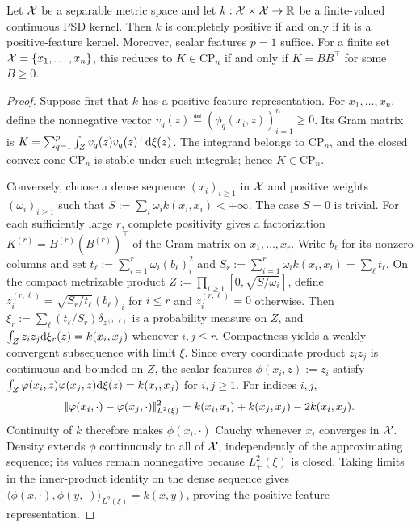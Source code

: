 \begin{prop}
\label{prop-cp-kernel-positive-features}
Let \(\mathcal{X}\) be a separable metric space and let \(k:\mathcal{X}\times\mathcal{X}\to\mathbb{R}\) be a finite-valued continuous PSD kernel. Then \(k\) is completely positive if and only if it is a positive-feature kernel. Moreover, scalar features \(p=1\) suffice. For a finite set \(\mathcal{X}=\{x_1,\ldots,x_n\}\), this reduces to \(K\in\mathrm{CP}_n\) if and only if \(K=BB^\top\) for some \(B\geq0\).
\end{prop}

\begin{proof}
Suppose first that \(k\) has a positive-feature representation. For \(x_1,\ldots,x_n\), define the nonnegative vector \(v_q(z)\eqdef(\phi_q(x_i,z))_{i=1}^n\geq0\). Its Gram matrix is \(K=\sum_{q=1}^p\int_Z v_q(z)v_q(z)^\top\mathrm{d}\xi(z)\).
The integrand belongs to \(\mathrm{CP}_n\), and the closed convex cone \(\mathrm{CP}_n\) is stable under such integrals; hence \(K\in\mathrm{CP}_n\).

Conversely, choose a dense sequence \((x_i)_{i\geq1}\) in \(\mathcal{X}\) and positive weights \((\omega_i)_{i\geq1}\) such that \(S:=\sum_i\omega_i k(x_i,x_i)<+\infty\). The case \(S=0\) is trivial. For each sufficiently large \(r\), complete positivity gives a factorization \(K^{(r)}=B^{(r)}(B^{(r)})^\top\) of the Gram matrix on \(x_1,\ldots,x_r\). Write \(b_\ell\) for its nonzero columns and set \(t_\ell:=\sum_{i=1}^r\omega_i(b_\ell)_i^2\) and \(S_r:=\sum_{i=1}^r\omega_i k(x_i,x_i)=\sum_\ell t_\ell\). On the compact metrizable product \(Z:=\prod_{i\geq1}[0,\sqrt{S/\omega_i}]\), define \(z^{(r,\ell)}_i=\sqrt{S_r/t_\ell}(b_\ell)_i\) for \(i\leq r\) and \(z^{(r,\ell)}_i=0\) otherwise. Then \(\xi_r:=\sum_\ell(t_\ell/S_r)\delta_{z^{(r,\ell)}}\) is a probability measure on \(Z\), and \(\int_Zz_i z_j\mathrm{d}\xi_r(z)=k(x_i,x_j)\) whenever \(i,j\leq r\). Compactness yields a weakly convergent subsequence with limit \(\xi\). Since every coordinate product \(z_i z_j\) is continuous and bounded on \(Z\), the scalar features \(\phi(x_i,z):=z_i\) satisfy \(\int_Z\varphi(x_i,z)\varphi(x_j,z)\mathrm{d}\xi(z)=k(x_i,x_j)\) for \(i,j\geq1\).
For indices \(i,j\),
\[
	|\!| \varphi(x_i,\cdot)-\varphi(x_j,\cdot) |\!|_{L^2(\xi)}^2
	=k(x_i,x_i)+k(x_j,x_j)-2k(x_i,x_j).
\]
Continuity of \(k\) therefore makes \(\phi(x_i,\cdot)\) Cauchy whenever \(x_i\) converges in \(\mathcal{X}\). Density extends \(\phi\) continuously to all of \(\mathcal{X}\), independently of the approximating sequence; its values remain nonnegative because \(L^2_+(\xi)\) is closed. Taking limits in the inner-product identity on the dense sequence gives \(\langle\phi(x,\cdot),\phi(y,\cdot)\rangle_{L^2(\xi)}=k(x,y)\), proving the positive-feature representation.
\end{proof}

